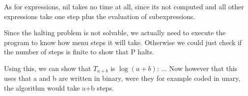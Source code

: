 As for expressions, nil takes no time at all, since its not computed and all
other expressions take one step plus the evaluation of subexpressions.

Since the halting problem is not solvable, we actually need to execute the
program to know how menu steps it will take. Otherwise we could just check if
the number of steps is finite to show that P halts.

Using this, we can show that $T_{a+b}$ is $\log(a+b)$: ...
Now however that this uses that a and b are written in binary, were they for
example coded in unary, the algorithm would take a+b steps. 
